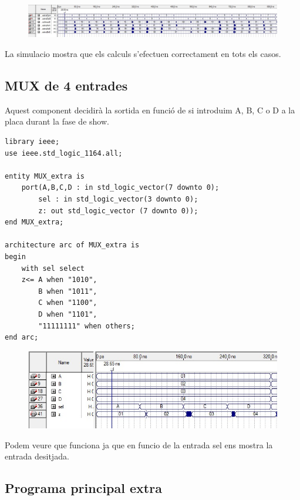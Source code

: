 \documentclass[12pt, a4papre]{article}
\begin{document}
	\begin{figure}[H]
		\begin{center}
		\includegraphics[width=130mm]{SimAxBextr.jpeg}
		\end{center}
	\end{figure}
	
	La simulacio mostra que els calculs s'efectuen correctament en tots els casos.
	
	\subsection{MUX de 4 entrades}
	Aquest component decidirà la sortida en funció de si introduim A, B, C o D a la placa durant la fase de show.
	
				\begin{lstlisting}[style=vhdl, frame=single, basicstyle=\tiny]
library ieee;
use ieee.std_logic_1164.all;

entity MUX_extra is 
	port(A,B,C,D : in std_logic_vector(7 downto 0);
		sel : in std_logic_vector(3 downto 0);
		z: out std_logic_vector (7 downto 0));
end MUX_extra;

architecture arc of MUX_extra is
begin
	with sel select 
	z<= A when "1010",
		B when "1011",
		C when "1100",
		D when "1101",
		"11111111" when others;
end arc;
\end{lstlisting}

	\begin{figure}[H]
		\begin{center}
		\includegraphics[width=130mm]{SimMUX.jpeg}
		\end{center}
	\end{figure}
	
	Podem veure que funciona ja que en funcio de la entrada sel ens mostra la entrada desitjada.
	
	\subsection{Programa principal extra}
	
\end{document}
